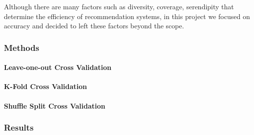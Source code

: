 	Although there are many factors such as diversity, coverage, serendipity that determine the efficiency of recommendation systems, in this project we focused on accuracy and decided to left these factors beyond the scope.
	\subsubsection{Methods}
	\paragraph{Leave-one-out Cross Validation}
	\paragraph{K-Fold Cross Validation}
	\paragraph{Shuffle Split Cross Validation}
	\subsubsection{Results}
